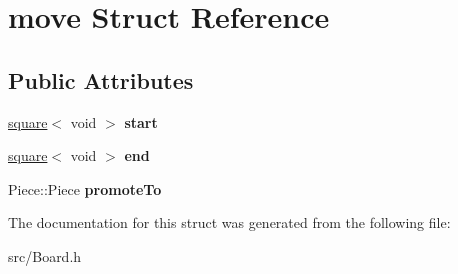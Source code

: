 \hypertarget{structmove}{}\section{move Struct Reference}
\label{structmove}
\subsection*{Public Attributes}
\begin{DoxyCompactItemize}
\item 
\mbox{\label{structmove_a3f8a82f7c7bc55f55874026ac254cd85}} 
\hyperlink{structsquare}{square}$<$ void $>$ {\bfseries start}
\item 
\mbox{\label{structmove_a205ae16ec975ed71eb4233bb38d21a75}} 
\hyperlink{structsquare}{square}$<$ void $>$ {\bfseries end}
\item 
\mbox{\label{structmove_a87fc4fc521c961cce03613dcb6cd0c6b}} 
Piece\+::\+Piece {\bfseries promote\+To}
\end{DoxyCompactItemize}


The documentation for this struct was generated from the following file\+:\begin{DoxyCompactItemize}
\item 
src/Board.\+h\end{DoxyCompactItemize}

